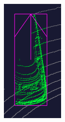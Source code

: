 \documentclass[letterpaper, 10 pt, conference]{ieeeconf}  %
\begin{document}
\begin{figure}
	\centering

	\begin{minipage}{0.22\textwidth}
		\centering
		\includegraphics[width=\textwidth]{./figures/points-enclosed} %

\end{minipage}
\end{figure}
\end{document}
